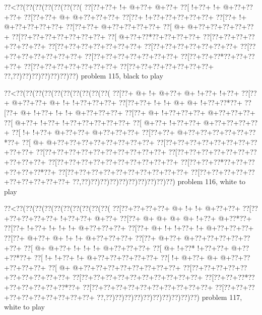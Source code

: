 \vbox{\vbox{\goo
\0??<\0??(\0??(\0??(\0??(\0??(\0??(\0??(
\0??[\0??+\0??+\- !+\- @+\0??+\- @+\0??+
\0??[\- !+\0??+\- !+\- @+\0??+\0??+\0??+
\0??[\0??+\0??+\- @+\- @+\0??+\0??+\0??+
\0??[\0??+\- !+\0??+\0??+\0??+\0??+\0??+
\0??[\0??+\- !+\- @+\0??+\0??+\0??+\0??+
\0??[\0??+\0??+\- @+\0??+\0??+\0??+\0??+
\0??[\- @+\- @+\0??+\0??+\0??+\0??+\0??+
\0??[\0??+\0??+\0??+\0??+\0??+\0??+\0??+
\0??[\- @+\0??+\0??*\0??+\0??+\0??+\0??+
\0??[\0??+\0??+\0??+\0??+\0??+\0??+\0??+
\0??[\0??+\0??+\0??+\0??+\0??+\0??+\0??+
\0??[\0??+\0??+\0??+\0??+\0??+\0??+\0??+
\0??[\0??+\0??+\0??+\0??+\0??+\0??+\0??+
\0??[\0??+\0??+\0??+\0??+\0??+\0??+\0??+
\0??[\0??+\0??+\0??*\0??+\0??+\0??+\0??+
\0??[\0??+\0??+\0??+\0??+\0??+\0??+\0??+
\0??[\0??+\0??+\0??+\0??+\0??+\0??+\0??+
\0??,\0??)\0??)\0??)\0??)\0??)\0??)\0??)
}
\hfil problem 115, black to play\hfil\break
}

\vbox{\vbox{\goo
\0??<\0??(\0??(\0??(\0??(\0??(\0??(\0??(\0??(\0??(\0??(
\0??[\0??+\- @+\- !+\- @+\0??+\- @+\- !+\0??+\- !+\0??+
\0??[\0??+\- @+\0??+\0??+\- @+\- !+\- !+\0??+\0??+\0??+
\0??[\0??+\0??+\- !+\- !+\- @+\- @+\- !+\0??+\0??*\0??+
\0??[\0??+\- @+\- !+\0??+\- !+\- !+\- @+\0??+\0??+\0??+
\0??[\0??+\- @+\- !+\0??+\0??+\0??+\- @+\0??+\0??+\0??+
\0??[\- @+\0??+\- !+\0??+\- !+\0??+\0??+\0??+\0??+\0??+
\0??[\- @+\0??+\- !+\0??+\0??+\- @+\0??+\0??+\0??+\0??+
\0??[\- !+\- !+\0??+\- @+\0??+\0??+\- @+\0??+\0??+\0??+
\0??[\0??+\0??+\- @+\0??+\0??+\0??+\0??+\0??+\0??*\0??+
\0??[\- @+\- @+\0??+\0??+\0??+\0??+\0??+\0??+\0??+\0??+
\0??[\0??+\0??+\0??+\0??+\0??+\0??+\0??+\0??+\0??+\0??+
\0??[\0??+\0??+\0??+\0??+\0??+\0??+\0??+\0??+\0??+\0??+
\0??[\0??+\0??+\0??+\0??+\0??+\0??+\0??+\0??+\0??+\0??+
\0??[\0??+\0??+\0??+\0??+\0??+\0??+\0??+\0??+\0??+\0??+
\0??[\0??+\0??+\0??*\0??+\0??+\0??+\0??+\0??+\0??*\0??+
\0??[\0??+\0??+\0??+\0??+\0??+\0??+\0??+\0??+\0??+\0??+
\0??[\0??+\0??+\0??+\0??+\0??+\0??+\0??+\0??+\0??+\0??+
\0??,\0??)\0??)\0??)\0??)\0??)\0??)\0??)\0??)\0??)\0??)
}
\hfil problem 116, white to play\hfil\break
}

\vbox{\vbox{\goo
\0??<\0??(\0??(\0??(\0??(\0??(\0??(\0??(\0??(\0??(\0??(
\0??[\0??+\0??+\0??+\0??+\- @+\- !+\- !+\- @+\0??+\0??+
\0??[\0??+\0??+\0??+\0??+\0??+\- !+\0??+\0??+\- @+\0??+
\0??[\0??+\- @+\- @+\- @+\- @+\- !+\0??+\- @+\0??*\0??+
\0??[\0??+\- !+\0??+\- !+\- !+\- !+\- @+\0??+\0??+\0??+
\0??[\0??+\- @+\- !+\- !+\0??+\- !+\- @+\0??+\0??+\0??+
\0??[\0??+\- @+\0??+\- @+\- !+\- !+\- @+\0??+\0??+\0??+
\0??[\0??+\- @+\0??+\- @+\0??+\0??+\0??+\0??+\0??+\0??+
\0??[\- @+\- @+\0??+\- !+\- !+\- !+\- @+\0??+\0??+\0??+
\0??[\- @+\- !+\0??*\- !+\0??+\0??+\- @+\0??+\0??*\0??+
\0??[\- !+\- !+\0??+\- !+\- @+\0??+\0??+\0??+\0??+\0??+
\0??[\- !+\- @+\0??+\- @+\- @+\0??+\0??+\0??+\0??+\0??+
\0??[\- @+\- @+\0??+\0??+\0??+\0??+\0??+\0??+\0??+\0??+
\0??[\0??+\0??+\0??+\0??+\0??+\0??+\0??+\0??+\0??+\0??+
\0??[\0??+\0??+\0??+\0??+\0??+\0??+\0??+\0??+\0??+\0??+
\0??[\0??+\0??+\0??*\0??+\0??+\0??+\0??+\0??+\0??*\0??+
\0??[\0??+\0??+\0??+\0??+\0??+\0??+\0??+\0??+\0??+\0??+
\0??[\0??+\0??+\0??+\0??+\0??+\0??+\0??+\0??+\0??+\0??+
\0??,\0??)\0??)\0??)\0??)\0??)\0??)\0??)\0??)\0??)\0??)
}
\hfil problem 117, white to play\hfil\break
}

